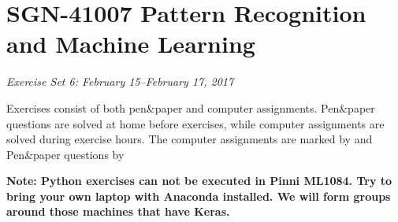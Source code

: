 \documentclass[a4paper,12pt]{scrartcl}
\newcommand{\python}{{\fbox{\texttt{\bfseries python}}\quad}}
\newcommand{\pen}{{\fbox{\texttt{\bfseries pen\&paper}}\quad}}
\begin{document}
\section*{SGN-41007 Pattern Recognition and Machine Learning}
\emph{Exercise Set 6: February 15--February 17, 2017}
\bigskip
\sloppy


\lstset{language=Python,style=mystyle} 


\noindent
Exercises consist of both pen\&paper and computer assignments.
Pen\&paper questions are solved at home before exercises, while
computer assignments are solved during exercise hours. The
computer assignments are marked by  \python and 
Pen\&paper questions by  \pen
\medskip

\noindent\textbf{Note: Python exercises can not be executed in Pinni ML1084.
Try to bring your own laptop with Anaconda installed. We will form 
groups around those machines that have Keras.}
\end{document}
